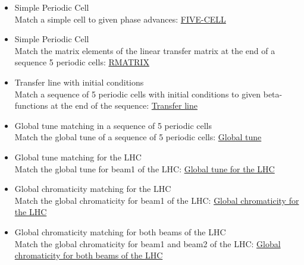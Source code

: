 \begin{itemize}
   \item Simple Periodic Cell\\
     Match a simple cell to given phase advances:
     \href{https://github.com/MethodicalAcceleratorDesign/madx-examples/blob/master/match/5cell/job.5cell.madx}
     {FIVE-CELL}
     
   \item Simple Periodic Cell\\
     Match the matrix elements of the linear transfer matrix at the
     end of a sequence 5 periodic cells:
     \href{https://github.com/MethodicalAcceleratorDesign/madx-examples/blob/master/match/r-matrix/job.r-matrix.madx}
     {RMATRIX}
     
   \item Transfer line with initial conditions\\
     Match a sequence of 5 periodic cells with initial conditions  to
     given beta-functions at the end of the sequence:
     \href{https://github.com/MethodicalAcceleratorDesign/madx-examples/blob/master/match/line/job.line.madx}
     {Transfer line}
     
   \item Global tune matching in a sequence of 5 periodic cells \\
     Match the global tune of a sequence of 5 periodic cells:
     \href{https://github.com/MethodicalAcceleratorDesign/madx-examples/blob/master/match/global-tune/job.global-tune.madx}
     {Global tune}
     
   \item Global tune matching for the LHC\\
     Match the global tune for beam1 of the LHC:
     \href{https://github.com/MethodicalAcceleratorDesign/madx-examples/blob/master/match/lhc.tune/job.lhc.tune.madx}
     {Global tune for the LHC}
     
   \item Global chromaticity matching for the LHC\\
     Match the global chromaticity for beam1 of the LHC:
     \href{https://github.com/MethodicalAcceleratorDesign/madx-examples/blob/master/match/lhc.chromaticity/job.lhc.chromaticity.madx}
     {Global chromaticity for the LHC}
     
   \item Global chromaticity matching for both beams of the LHC\\
     Match the global chromaticity for beam1 and beam2 of the LHC:
     \href{https://github.com/MethodicalAcceleratorDesign/madx-examples/blob/master/match/lhc.2chromaticity/job.lhc.2chromaticity.madx}
     {Global chromaticity for both beams of the LHC}
     

\end{itemize}
